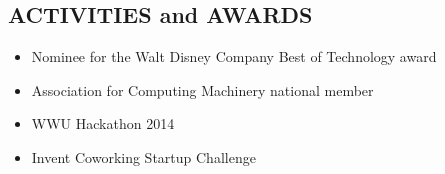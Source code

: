 \documentclass[line,margin]{res}
\begin{document}
\begin{resume}
\section{ACTIVITIES and AWARDS}
	\begin{itemize} \itemsep -3pt
	\item Nominee for the Walt Disney Company Best of Technology award
	\item Association for Computing Machinery national member
	\item WWU Hackathon 2014
	\item Invent Coworking Startup Challenge
	\end{itemize}

\end{resume}
\end{document}
